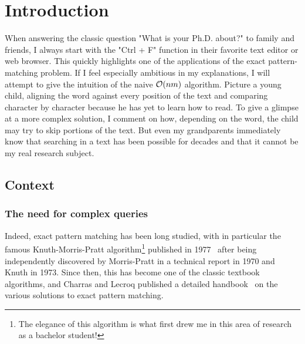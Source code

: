 \chapter*{Introduction}\label{chap:intro}

When answering the classic question "What is your Ph.D. about?" to family and friends, I always start with the "Ctrl + F" function in their favorite text editor or web browser. This quickly highlights one of the applications of the exact pattern-matching problem. If I feel especially ambitious in my explanations, I will attempt to give the intuition of the naive $\mathcal{O}(nm)$ algorithm. Picture a young child, aligning the word against every position of the text and comparing character by character because he has yet to learn how to read. To give a glimpse at a more complex solution, I comment on how, depending on the word, the child may try to skip portions of the text. But even my grandparents immediately know that searching in a text has been possible for decades and that it cannot be my real research subject.

\section{Context}
\subsection{The need for complex queries} 

Indeed, exact pattern matching has been long studied, with in particular the famous Knuth-Morris-Pratt algorithm\footnote{The elegance of this algorithm is what first drew me in this area of research as a bachelor student!} published in 1977~\cite{KMP} after being independently discovered by Morris-Pratt in a technical report in 1970 and Knuth in 1973. Since then, this has become one of the classic textbook algorithms, and Charras and Lecroq published a detailed handbook~\cite{charras2004handbook} on the various solutions to exact pattern matching.



